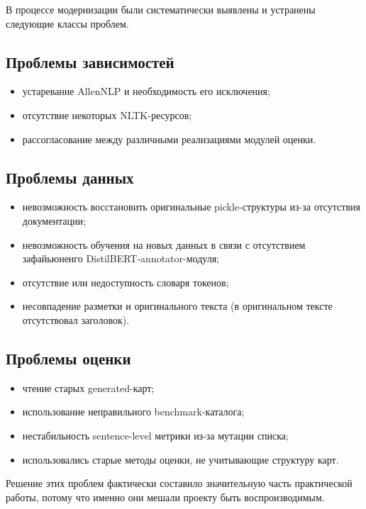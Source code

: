 \documentclass[12pt,a4paper]{article}
\begin{document}
В процессе модернизации были систематически выявлены и устранены следующие классы
проблем.

\subsection{Проблемы зависимостей}

\begin{itemize}
    \item устаревание AllenNLP и необходимость его исключения;
    \item отсутствие некоторых NLTK-ресурсов;
    \item рассогласование между различными реализациями модулей оценки.
\end{itemize}

\subsection{Проблемы данных}

\begin{itemize}
    \item невозможность восстановить оригинальные pickle-структуры из-за отсутствия документации;
    \item невозможность обучения на новых данных в связи с отсутствием зафайьюненго DistilBERT-annotator-модуля;
    \item отсутствие или недоступность словаря токенов;
    \item несовпадение разметки и оригинального текста (в оригинальном тексте отсутствовал заголовок).
\end{itemize}

\subsection{Проблемы оценки}

\begin{itemize}
    \item чтение старых generated-карт;
    \item использование неправильного benchmark-каталога;
    \item нестабильность sentence-level метрики из-за мутации списка;
    \item использовались старые методы оценки, не учитывающие структуру карт.
\end{itemize}

Решение этих проблем фактически составило значительную часть практической работы, потому
что именно они мешали проекту быть воспроизводимым.
\end{document}
